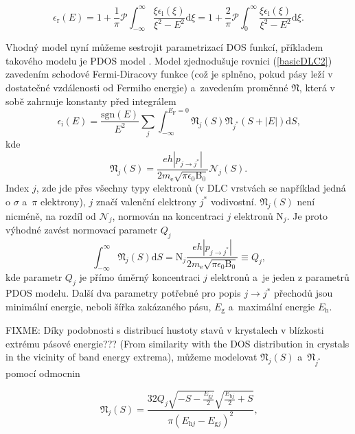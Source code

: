 \begin{equation}
\epsilon_\mathrm{r}(E) = 
1 + \frac{1}{\pi} \mathcal{P} \int_{-\infty}^\infty \frac{\xi \epsilon_\mathrm{i}(\xi)}{\xi^2 - E^2} \mathrm{d}\xi = 
1 + \frac{2}{\pi} \mathcal{P} \int_0^\infty \frac{\xi \epsilon_\mathrm{i}(\xi)}{\xi^2 - E^2} \mathrm{d}\xi 
\text{.}
\end{equation}


Vhodný model nyní můžeme sestrojit parametrizací DOS funkcí, příkladem takového modelu je PDOS model \cite{franta2007}. Model zjednodušuje rovnici (\ref{basicDLC2}) zavedením schodové Fermi-Diracovy funkce (což je splněno, pokud pásy leží v dostatečné vzdálenosti od Fermiho energie) a~zavedením proměnné $\mathfrak{N}$, která v sobě zahrnuje konstanty před integrálem 
\begin{equation}
\label{epsilonDOS}
\epsilon_\mathrm{i}(E) = \frac{\mathrm{sgn}(E)}{E^2} \sum_{j} \int_{-\infty}^{E_\mathrm{F} = 0} \mathfrak{N}_j(S) \mathfrak{N}_{j^*}(S + |E|)\mathrm{d}S \text{,}
\end{equation}
kde
\begin{equation}
\label{unormN}
\mathfrak{N}_j(S) = \frac{eh | p_{j \rightarrow j^*} |}{2 m_\mathrm{e} \sqrt{\pi \epsilon_0 \mathrm{B}_0}} \mathcal{N}_j(S) \text{.}
\end{equation}
Index $j$, zde jde přes všechny typy elektronů (v DLC vrstvách se například jedná o $\sigma$ a~$\pi$ elektrony), $j$ značí valenční elektrony $j^*$ vodivostní. $\mathfrak{N}_j(S)$ není nicméně, na rozdíl od $\mathcal{N}_j$, normován na koncentraci $j$ elektronů $\mathrm{N}_j$. Je proto výhodné zavést normovací parametr $Q_j$
\begin{equation}
\int_{-\infty}^\infty \mathfrak{N}_j(S) \mathrm{d}S = 
\mathrm{N}_j \frac{eh | p_{j \rightarrow j^*} |}{2 m_\mathrm{e} \sqrt{\pi \epsilon_0 \mathrm{B}_0}} \equiv
Q_j \text{,}
\end{equation}
kde parametr $Q_j$ je přímo úměrný koncentraci $j$ elektronů a~je jeden z parametrů PDOS modelu. Další dva parametry potřebné pro popis $j \rightarrow j^*$ přechodů jsou minimální energie, neboli šířka zakázaného pásu, $E_\mathrm{g}$ a~maximální energie $E_\mathrm{h}$. 

FIXME: Díky podobnosti s distribucí hustoty stavů v krystalech v blízkosti extrému pásové energie???  (From similarity with the DOS distribution in crystals in the vicinity of band energy extrema), můžeme modelovat $\mathfrak{N}_j(S)$ a~$\mathfrak{N}_{j^*}$ pomocí odmocnin

\begin{equation}
\label{N1}
 \mathfrak{N}_j(S) = 
\frac{
		32Q_j 
		\sqrt{-S-\frac{E_{\mathrm{g}j}}{2}}
		\sqrt{\frac{E_{\mathrm{h}j}}{2}+S}
	}{
		\pi (E_{\mathrm{h}j} - E_{\mathrm{g}j})^2
	}
\text{,}
\end{equation}

